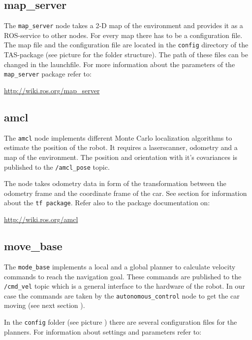 \subsection{map\_server}
\label{sec:tas_package_map_server}
The \texttt{map\_server} node takes a 2-D map of the environment and provides it as a ROS-service to other nodes. For every map there has to be a configuration file. The map file and the configuration file are located in the \texttt{config} directory of the TAS-package (see picture  for the folder structure). The path of these files can be changed in the launchfile. For more information about the parameters of the \texttt{map\_server} package refer to:

\hyperref[http://wiki.ros.org/map_server]{http://wiki.ros.org/map\_server}


\subsection{amcl}
\label{sec:tas_package_amcl}
The \texttt{amcl} node implements different Monte Carlo localization algorithms to estimate the position of the robot. It requires a laserscanner, odometry and a map of the environment. The position and orientation with it's covariances is published to the \texttt{/amcl\_pose} topic.

The node takes odometry data in form of the transformation between the odometry frame and the coordinate frame of the car. See section  for information about the \texttt{tf package}. Refer also to the package documentation on:

\hyperref[http://wiki.ros.org/amcl]{http://wiki.ros.org/amcl}



\subsection{move\_base}
\label{sec:tas_package_move_base}

The \texttt{mode\_base} implements a local and a global planner to calculate velocity commands to reach the navigation goal. These commands are published to the \texttt{/cmd\_vel} topic which is a general interface to the hardware of the robot. In our case the commands are taken by the \texttt{autonomous\_control} node to get the car moving (see next section ).

In the \texttt{config} folder (see picture ) there are several configuration files for the planners. For information about settings and parameters refer to:

